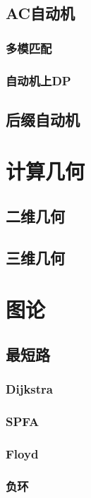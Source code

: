 \documentclass[twocolumn,a4]{article}
\newcommand{\addcpp}[1]{}
\begin{document}
	\subsection{AC自动机	}
		\subsubsection{多模匹配}
			\addcpp{string/Aho-CorasickAutomaton}
		\subsubsection{自动机上DP}
			\addcpp{string/Aho-CorasickAutomaton_dp}
	\subsection{后缀自动机}

\section{计算几何}
	\subsection{二维几何}
		\addcpp{geometry/geometry-2D}
	\subsection{三维几何}
	
\section{图论}
	\subsection{最短路}
		\subsubsection{Dijkstra}
			\addcpp{graph/dijkstra}
		\subsubsection{SPFA}
		\subsubsection{Floyd}
		\subsubsection{负环}
			\addcpp{graph/spfa_negative_circle}
\end{document}

